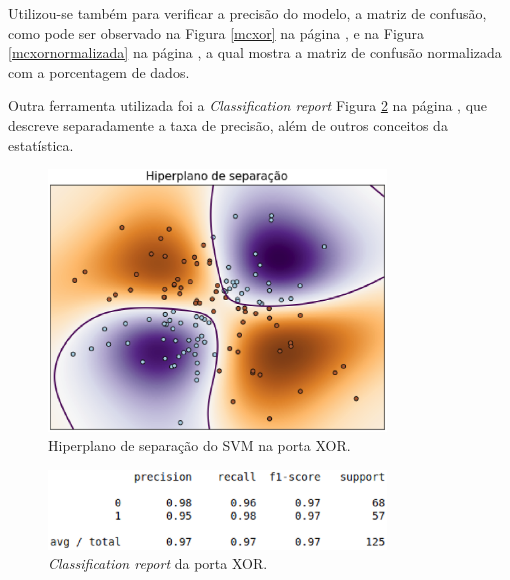 Utilizou-se também para verificar a precisão do modelo, a matriz de confusão, como pode ser observado na Figura \ref{mcxor} na página \pageref{mcxor}, e na Figura \ref{mcxornormalizada} na página \pageref{mcxornormalizada}, a qual mostra a matriz de confusão normalizada com a porcentagem de dados.

Outra ferramenta utilizada foi a \textit{Classification report} Figura \ref{class_report} na página \pageref{class_report}, que descreve separadamente a taxa de precisão, além de outros conceitos da estatística.

\begin{figure}[!htb]
	\centering
	\includegraphics[width=0.8\textwidth]{figuras/xor.eps}
	\caption{Hiperplano de separação do SVM na porta XOR.}
	\label{svmxor}
\end{figure}

\begin{figure}[!htb]
	\centering
	\includegraphics[width=0.8\textwidth]{figuras/class_report.eps}
	\caption{\textit{Classification report} da porta XOR.}
	\label{class_report}
\end{figure}

